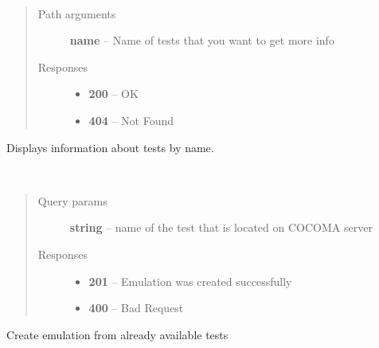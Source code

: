 \documentclass[letterpaper,10pt,english]{sphinxmanual}
\begin{document}
\begin{fulllineitems}
\label{01_how_to_use_it:method-get-tests-name-}~\begin{quote}\begin{description}
\item[{Path arguments}] \leavevmode
\textbf{name} -- Name of tests that you want to get more info

\item[{Responses}] \leavevmode\begin{itemize}
\item {} 
\textbf{200} -- OK

\item {} 
\textbf{404} -- Not Found

\end{itemize}

\end{description}\end{quote}

Displays information about tests by name.

\end{fulllineitems}


\begin{fulllineitems}
\label{01_how_to_use_it:method-post-tests-name-}~\begin{quote}\begin{description}
\item[{Query params}] \leavevmode
\textbf{string} -- name of the test that is located on COCOMA server

\item[{Responses}] \leavevmode\begin{itemize}
\item {} 
\textbf{201} -- Emulation was created successfully

\item {} 
\textbf{400} -- Bad Request

\end{itemize}

\end{description}\end{quote}

Create emulation from already available tests

\end{fulllineitems}
\end{document}

